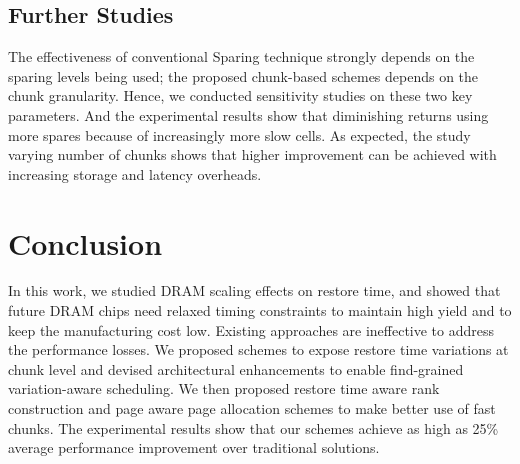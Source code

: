 \subsection{Further Studies}
The effectiveness of conventional Sparing technique strongly depends on the sparing levels being used; the proposed chunk-based schemes depends on the chunk granularity. Hence, we conducted sensitivity studies on these two key parameters. 
And the experimental results show that diminishing returns using more spares because of increasingly more slow cells.
As expected, the study varying number of chunks shows that higher improvement can be achieved with increasing storage and latency overheads.

\section{Conclusion}
In this work, we studied DRAM scaling effects on restore time, and showed that future DRAM chips need relaxed timing constraints to maintain high yield and to keep the manufacturing cost low. Existing approaches are ineffective to address the performance losses. 
We proposed schemes to expose restore time variations at chunk level and devised architectural enhancements to enable find-grained variation-aware scheduling. We then proposed restore time aware rank construction and page aware page allocation schemes to make better use of fast chunks. The experimental results show that our schemes achieve as high as 25\% average performance improvement over traditional solutions.

